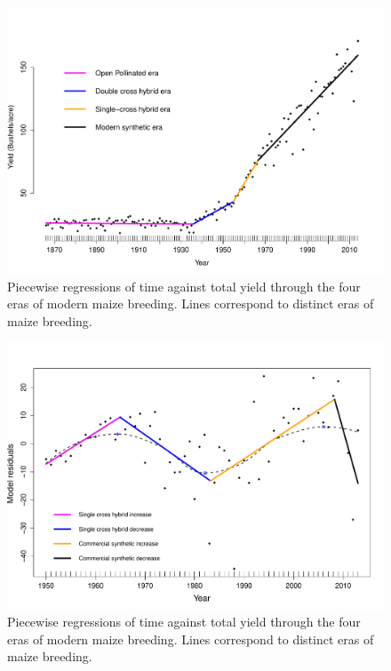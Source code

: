 \documentclass[12pt]{article}
\begin{document}
\begin{figure}[ht]
\includegraphics[width=1.0\linewidth]{yield.pdf}
\caption{Piecewise regressions of time against total yield through the four eras of modern maize breeding. Lines correspond to distinct eras of maize breeding.} 
\end{figure}

\begin{figure}[ht]
\includegraphics[width=1.0\linewidth]{inflection_point.pdf}
\caption{Piecewise regressions of time against total yield through the four eras of modern maize breeding. Lines correspond to distinct eras of maize breeding.} 
\end{figure}
\end{document}
